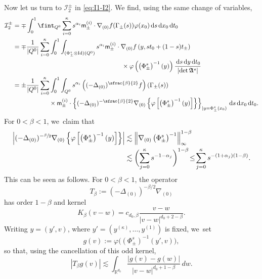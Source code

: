 \documentclass[JEP,XML,SOM,Unicode,NoFloatCountersInSection,published]{cedram}
\theoremstyle{definition}
\newcommand{\cI}{{\mathcal I}}
\newcommand{\I}{\textup{Id}}\let\Id\I
\newcommand{\dd}{{\, \mathrm d}}
\begin{document}
Now let us turn to $\cI_2^\pm$ in \eqref{eq:I1-I2}. We
find, using the same change of variables,
\begin{equation*}
\begin{aligned}
\cI_2^\pm
& = \mp\int_0^1 \fint_{Q^0} \sum_{i = 0}^\kappa
s^{\alpha_i} \mathsf m_\pm^{(i)} \cdot\nabla_{(0)}
f(\Gamma_\pm(s)) \varphi(x_0) \dd s \dd x_0 \dd t_0 \\
& = \mp \frac{1}{\vert Q^0\vert} \sum_{i = 0}^\kappa
\int_0^1 \int_{(\Phi^s_\pm \otimes \I)(Q^0)} s^{\alpha_i}
\mathsf m_\pm^{(i)} \cdot\nabla_{(0)}
f \left(y,st_0 + (1-s)t_\pm \right) \\
& \hspace{6cm} \times \varphi
\left(\left(\Phi^s_\pm \right)^{-1} (y)\right)
\frac{\dd s \dd y \dd t_0}{\left| \det \mathfrak A^s \right|}\\
& ={\pm} \frac{1}{\vert Q^0\vert }\sum_{i = 0}^\kappa
\int_0^1 \int_{{Q^0}} s^{\alpha_i} \left((-\Delta_{(0)})^{\sfrac{\beta}{2}}
f\right)\left(\Gamma_\pm(s) \right) \\
& \hspace{2cm} \times \mathsf m_\pm^{(i)}
\cdot \left\{ (-\Delta_{(0)})^{-\sfrac{\beta}{2}}\nabla_{(0)}
\left\{\varphi\left[ \left(\Phi_\pm^s \right)^{-1} (y)\right]\right\}
\right\}_{|y=\Phi^s_\pm(x_0)} \dd s \dd x_0 \dd t_0.
\end{aligned}
\end{equation*}
For $0<\beta<1$, we~claim that
\begin{equation}
\label{e.scaling.aux}
\begin{aligned}
\left| (-\Delta_{(0)})^{-\sfrac{\beta}{2}}\nabla_{(0)}
\left\{\varphi\left[ \left(\Phi_\pm^s \right)^{-1}
(y)\right]\right\} \right|
&\lesssim
\left\| \nabla_{(0)} \left(\Phi^s _\pm \right)^{-1}
\right\|_\infty ^{1-\beta}
\\
&
\lesssim \biggl(
\sum_{j=0} ^\kappa s^{-1-\alpha_j} \biggr)^{1-\beta}
\!\leq\!
\sum_{j=0} ^\kappa s^{-(1+\alpha_j)(1-\beta)} .
\end{aligned}
\end{equation}
This can be seen as follows. For \(0<\beta<1\), the operator
\[
T_\beta:=(-\Delta_{(0)})^{-\beta/2}\nabla_{(0)}
\]
has order \(1-\beta\) and kernel
\[
K_\beta(v-w)
=c_{d_0,\beta}\frac{v-w}{|v-w|^{d_0+2-\beta}}.
\]
Writing $y=(y',v)$, where
$y'=(y^{(\kappa)},\ldots,y^{(1)})$ is fixed, we~set
\[
g(v):=\varphi\big((\Phi_\pm^s)^{-1}(y',v)\big),
\]
so that, using the cancellation of this odd kernel,
\[
|T_\beta g(v)|
\lesssim
\int_{\mathbb R^{d_0}}
\frac{|g(v)-g(w)|}{|v-w|^{d_0+1-\beta}}\,dw .
\]
\end{document}
